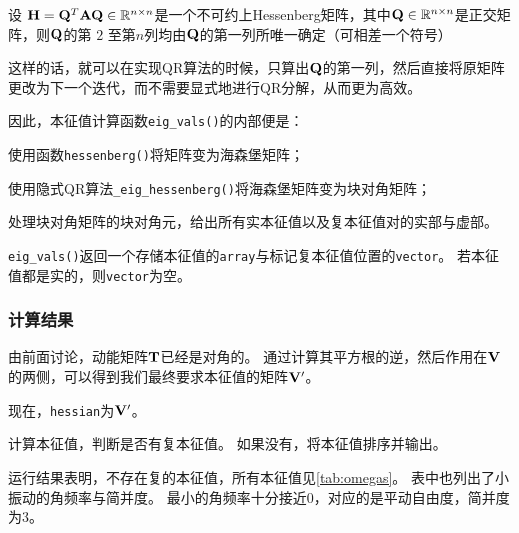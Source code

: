\begin{mythm}[隐式QR定理]
    设 $\vb{H} = \vb{Q}^T\vb{A}\vb{Q} \in \mathbb{R}^{n\times n} $是一个不可约上Hessenberg矩阵，其中$\vb{Q}\in \mathbb{R}^{n\times n}$是正交矩阵，则$\vb{Q}$的第 $2$ 至第$n$列均由$\vb{Q}$的第一列所唯一确定（可相差一个符号）
\end{mythm}

这样的话，就可以在实现QR算法的时候，只算出$\vb{Q}$的第一列，然后直接将原矩阵更改为下一个迭代，而不需要显式地进行QR分解，从而更为高效。

因此，本征值计算函数\texttt{eig\_vals()}的内部便是：
\begin{compactenum}
    \item 使用函数\texttt{hessenberg()}将矩阵变为海森堡矩阵；
    \item 使用隐式QR算法\texttt{\_eig\_hessenberg()}将海森堡矩阵变为块对角矩阵；
    \item 处理块对角矩阵的块对角元，给出所有实本征值以及复本征值对的实部与虚部。
\end{compactenum}
\texttt{eig\_vals()}返回一个存储本征值的\texttt{array}与标记复本征值位置的\texttt{vector}。
若本征值都是实的，则\texttt{vector}为空。

\subsubsection{计算结果}
由前面讨论，动能矩阵$\vb{T}$已经是对角的。
通过计算其平方根的逆，然后作用在$\vb{V}$的两侧，可以得到我们最终要求本征值的矩阵$\vb{V}'$。
{
    \linespread{1.0}
    
}
现在，\texttt{hessian}为$\vb{V}'$。

计算本征值，判断是否有复本征值。
如果没有，将本征值排序并输出。
{
    \linespread{1.0}
    
}

运行结果表明，不存在复的本征值，所有本征值见\autoref{tab:omegas}。
表中也列出了小振动的角频率与简并度。
最小的角频率十分接近0，对应的是平动自由度，简并度为3。

